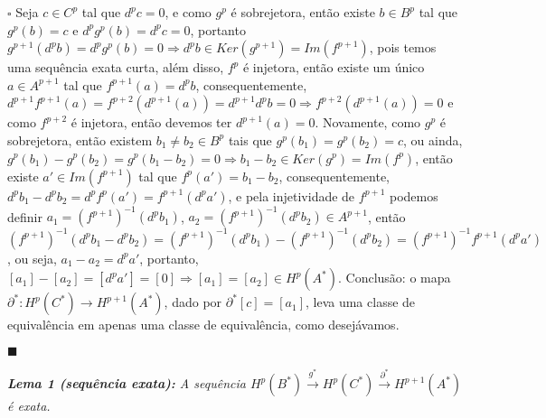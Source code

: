 \documentclass{article}
\begin{document}
	$\square$ Seja $c \in C^{p}$ tal que $d^{p}c=0$, e como $g^{p}$ é sobrejetora, então existe $b \in B^{p}$ tal que $g^{p}(b) = c$ e $d^{p}g^{p}(b) = d^{p}c = 0$, portanto $g^{p+1}(d^{p}b) = d^{p}g^{p}(b) = 0 \Rightarrow d^{p}b \in Ker(g^{p+1}) = Im(f^{p+1})$, pois temos uma sequência exata curta, além disso, $f^{p}$ é injetora, então existe um único $a \in A^{p+1}$ tal que $f^{p+1}(a) = d^{p}b$, consequentemente, $d^{p+1}f^{p+1}(a) = f^{p+2}(d^{p+1}(a))=d^{p+1}d^{p}b=0 \Rightarrow f^{p+2}(d^{p+1}(a)) =0$ e como $f^{p+2}$ é injetora, então devemos ter $d^{p+1}(a)=0$. Novamente, como $g^{p}$ é sobrejetora, então existem $b_{1} \neq b_{2} \in B^{p}$ tais que $g^{p}(b_{1}) = g^{p}(b_{2}) = c$, ou ainda, $g^{p}(b_{1}) - g^{p}(b_{2}) = g^{p}(b_{1}-b_{2}) = 0 \Rightarrow b_{1}-b_{2} \in Ker(g^{p}) = Im(f^{p})$, então existe $a' \in Im(f^{p+1})$ tal que $f^{p}(a') = b_{1}-b_{2}$, consequentemente, $d^{p}b_{1} - d^{p}b_{2} = d^{p}f^{p}(a') = f^{p+1}(d^{p}a')$, e pela injetividade de $f^{p+1}$ podemos definir $a_{1} = (f^{p+1})^{-1}(d^{p}b_{1})$, $ a_{2} = (f^{p+1})^{-1}(d^{p}b_{2}) \in A^{p+1}$, então $(f^{p+1})^{-1}(d^{p}b_{1} - d^{p}b_{2}) =(f^{p+1})^{-1}(d^{p}b_{1}) - (f^{p+1})^{-1}(d^{p}b_{2})  = (f^{p+1})^{-1}f^{p+1}(d^{p}a')$, ou seja, $a_{1} - a_{2} = d^{p}a'$, portanto, $[a_{1}] - [a_{2}] = [d^{p}a'] = [0] \Rightarrow [a_{1}] = [a_{2}] \in H^{p}(A^{*})$. Conclusão: o mapa $\partial^{*}: H^{p}(C^{*}) \to H^{p+1}(A^{*})$, dado por $\partial^{*}[c] = [a_{1}]$, leva uma classe de equivalência em apenas uma classe de equivalência, como desejávamos. 
	
	$\blacksquare$
	
	\vspace{2mm}
	\textit{\textbf{Lema 1 (sequência exata):} A sequência $H^{p}(B^{*}) \xrightarrow{g^{*}} H^{p}(C^{*}) \xrightarrow{\partial^{*}} H^{p+1}(A^{*})$ é exata.}
	
\end{document}
